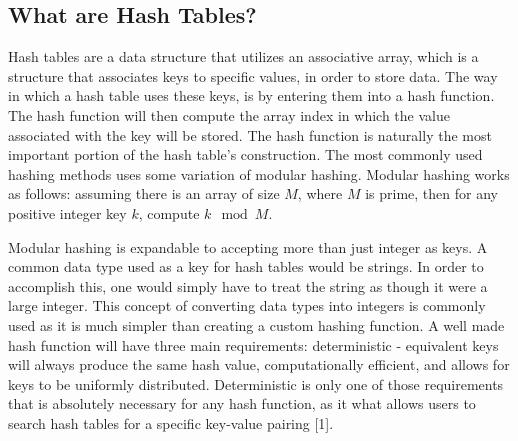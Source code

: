 \documentclass[conference]{IEEEtran}
\begin{document}
\subsection{What are Hash Tables?}
Hash tables are a data structure that utilizes an associative array, which is a structure that associates keys to specific values, in order to store data. The way
in which a hash table uses these keys, is by entering them into a hash function. The hash function will then compute the array index in which
the value associated with the key will be stored. The hash function is naturally the most important portion of the hash table's construction.
The most commonly used hashing methods uses some variation of modular hashing. Modular hashing works as follows: assuming there is an array of size
$M$, where $M$ is prime, then for any positive integer key $k$, compute $k \mod{M}$. 

Modular hashing is expandable to accepting more than just integer as keys. A common data type used as a key for hash tables would be strings.
In order to accomplish this, one would simply have to treat the string as though it were a large integer. This concept of converting data types into
integers is commonly used as it is much simpler than creating a custom hashing function. A well made hash function will have three main requirements:
deterministic - equivalent keys will always produce the same hash value, computationally efficient, and allows for keys to be uniformly distributed.
Deterministic is only one of those requirements that is absolutely necessary for any hash function, as it what allows users to search hash tables
for a specific key-value pairing [1].
\end{document}
